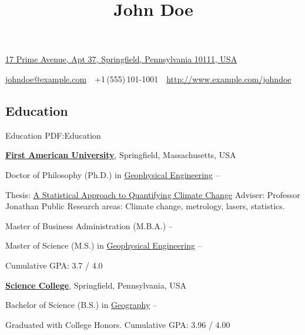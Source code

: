 \documentclass[a4paper,10pt,oneside]{article}
\begin{document}

\title{John Doe}

\begin{subtitle}
\href{https://maps.google.com/maps?q=1+North+Avenue,+Apt+42,+Springfield,+Pennsylvania+12345,+USA}
{17 Prime Avenue, Apt 37, Springfield, Pennsylvania 10111, USA}
\par
\href{mailto:johndoe@example.com}
{johndoe@example.com}
\,\BulletSymbol\,
+1\,(555)\,101-1001
\,\BulletSymbol\,
\href{http://www.example.com/johndoe}
{http://www.example.com/johndoe}
\end{subtitle}

\begin{body}


\section
{Education}
{Education}
{PDF:Education}

\href{http://www.example.com/my-university}
{\textbf{First American University}},
Springfield, Massachusetts, USA

\SmallEntryGap
Doctor of Philosophy (Ph.D.) in
\href{http://www.example.com/my-department}
{Geophysical Engineering}
\hfill
{} --
\begin{detail}
\BulletItem
Thesis:
\href{http://www.example.com/my-phd-thesis}
{A Statistical Approach to Quantifying Climate Change}
\BulletItem
Adviser:
Professor Jonathan Public
\BulletItem
Research areas:
Climate change, metrology, lasers, statistics.
\end{detail}

\SmallEntryGap
Master of Business Administration (M.B.A.)
\hfill
{} --

\SmallEntryGap
Master of Science (M.S.) in
\href{http://www.example.com/my-department}
{Geophysical Engineering}
\hfill
{} --
\begin{detail}
\BulletItem
Cumulative GPA: 3.7 / 4.0
\end{detail}

\EntryGap
\href{http://www.example.com/my-college}
{\textbf{Science College}},
Springfield, Pennsylvania, USA
\par
Bachelor of Science (B.S.) in
\href{http://www.example.com/my-department}
{Geography}
\hfill
{} --
\begin{detail}
\BulletItem
Graduated with College Honors.
\BulletItem
Cumulative GPA: 3.96 / 4.00
\end{detail}


\end{body}
\end{document}
